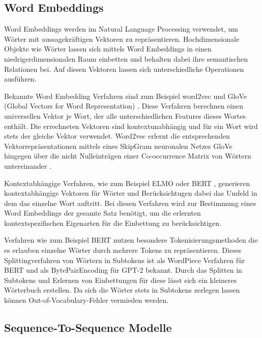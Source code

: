 \subsection{Word Embeddings}
Word Embeddings werden im Natural Language Processing verwendet, um Wörter mit aussagekräftigen Vektoren zu repräsentieren. 
Hochdimensionale Objekte wie Wörter lassen sich mittels Word Embeddings in einen niedrigerdimensionalen Raum einbetten und behalten dabei ihre semantischen Relationen bei. 
Auf diesen Vektoren lassen sich unterschiedliche Operationen ausführen.


Bekannte Word Embedding Verfahren sind zum Beispiel word2vec \citep{word2vec} und GloVe (Global Vectors for Word Representation) \citep{glove}. 
Diese Verfahren berechnen einen universellen Vektor je Wort, der alle unterschiedlichen Features dieses Wortes enthält.
Die errechneten Vektoren sind kontextunabhängig und für ein Wort wird stets der gleiche Vektor verwendet. 
Word2vec erlernt die entsprechenden Vektorrepräsentationen mittels eines SkipGram neuronalen Netzes \citep{word2vec} GloVe hingegen über die nicht Nulleinträgen einer Co-occurrence Matrix von Wörtern untereinander \citep{glove}. 

Kontextabhängige Verfahren, wie zum Beispiel ELMO \citep{elmo} oder BERT \citep{DBLP:journals/corr/abs-1810-04805}, generieren kontextabhängige Vektoren für Wörter und Berücksichtugen dabei das Umfeld in dem das einzelne Wort auftritt.
Bei diesen Verfahren wird zur Bestimmung eines Word Embeddings der gesamte Satz benötigt, um die erlernten kontextspezifischen Eigenarten für die Einbettung zu berücksichtigen. 

Verfahren wie zum Beispiel BERT nutzen besondere Tokenisierungsmethoden die es erlauben einzelne Wörter durch mehrere Tokens zu repräsentieren.
Dieses Splittingverfahren von Wörtern in Subtokens ist als WordPiece Verfahren \citep{wordpiece} für BERT und als BytePairEncoding \citep{bytepairencoding} für GPT-2 bekannt. 
Durch das Splitten in Subtokens und Erlernen von Einbettungen für diese lässt sich ein kleineres Wörterbuch erstellen. 
Da sich die Wörter stets in Subtokens zerlegen lassen können Out-of-Vocabulary-Fehler vermieden werden.

\subsection{Sequence-To-Sequence Modelle}


